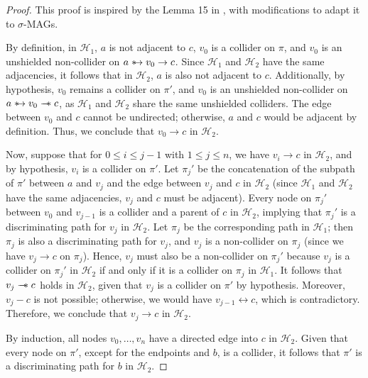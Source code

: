 \documentclass[accepted]{uai2025} %
\newcommand{\huh}{\mathrel{\leftrightarrow}}
\newcommand{\suh}{\mathrel{{\ast\mkern-11mu\to}}}
\newcommand{\tus}{\mathrel{{\relbar\mkern-11mu\relbar\mkern-11mu\ast}}}
\begin{document}
\lemmafifteen*
\begin{proof}
This proof is inspired by the Lemma 15 in \citep{spirtes1996polynomial}, with modifications to adapt it to \( \sigma \)-MAGs.

By definition, in \( \mathcal{H}_1 \), \( a \) is not adjacent to \( c \), \( v_0 \) is a collider on \( \pi \), and \( v_0 \) is an unshielded non-collider on \( a \suh v_0 \rightarrow c \). Since \( \mathcal{H}_1 \) and \( \mathcal{H}_2 \) have the same adjacencies, it follows that in \( \mathcal{H}_2 \), \( a \) is also not adjacent to \( c \). Additionally, by hypothesis, \( v_0 \) remains a collider on \( \pi' \), and \( v_0 \) is an unshielded non-collider on \( a \suh v_0 \tus  c \), as \( \mathcal{H}_1 \) and \( \mathcal{H}_2 \) share the same unshielded colliders. The edge between \( v_0 \) and \( c \) cannot be undirected; otherwise, \( a \) and \( c \) would be adjacent by definition. Thus, we conclude that \( v_0 \rightarrow c \) in \( \mathcal{H}_2 \).  

Now, suppose that for \( 0 \leq i \leq j-1 \) with \(1\leq j \leq n \), we have \( v_i \rightarrow c \) in \( \mathcal{H}_2 \), and by hypothesis, \( v_i \) is a collider on \( \pi' \). Let \( \pi_j' \) be the concatenation of the subpath of \( \pi' \) between \( a \) and \( v_j \) and the edge between \( v_j \) and \( c \) in \( \mathcal{H}_2 \) (since \( \mathcal{H}_1 \) and \( \mathcal{H}_2 \) have the same adjacencies, \( v_j \) and \( c \) must be adjacent). Every node on \( \pi_j' \) between \( v_0 \) and \( v_{j-1} \) is a collider and a parent of \( c \) in \( \mathcal{H}_2 \), implying that \( \pi_j' \) is a discriminating path for \( v_j \) in \( \mathcal{H}_2 \). Let \( \pi_j \) be the corresponding path in \( \mathcal{H}_1 \); then \( \pi_j \) is also a discriminating path for \( v_j \), and \( v_j \) is a non-collider on \( \pi_j \) (since we have \( v_j \rightarrow c \) on \( \pi_j \)). Hence, \( v_j \) must also be a non-collider on \( \pi_j' \) because \( v_j \) is a collider on \( \pi_j' \) in \( \mathcal{H}_2 \) if and only if it is a collider on \( \pi_j \) in \( \mathcal{H}_1 \). It follows that \( v_j \tus  c \) holds in \( \mathcal{H}_2 \), given that \( v_j \) is a collider on \( \pi' \) by hypothesis. Moreover, \( v_j - c \) is not possible; otherwise, we would have \( v_{j-1} \huh  c \), which is contradictory. Therefore, we conclude that \( v_j \rightarrow c \) in \( \mathcal{H}_2 \).  

By induction, all nodes $v_0,\ldots,v_n$ have a directed edge into \( c \) in $\mathcal{H}_2$. Given that every node on \( \pi' \), except for the endpoints and \( b \), is a collider, it follows that \( \pi' \) is a discriminating path for \( b \) in \( \mathcal{H}_2 \).
\end{proof}
\end{document}
